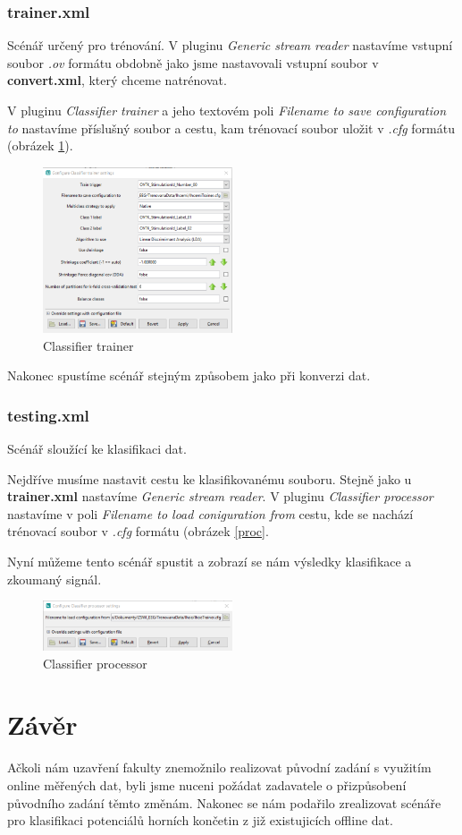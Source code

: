 \documentclass{report}
\begin{document}
\subsection{trainer.xml}
Scénář určený pro trénování. V pluginu \textit{Generic stream reader} nastavíme vstupní soubor \textit{.ov} formátu obdobně jako jsme nastavovali vstupní soubor v \textbf{convert.xml}, který chceme natrénovat.

V pluginu \textit{Classifier trainer} a jeho textovém poli \textit{Filename to save configuration to} nastavíme příslušný soubor a cestu, kam trénovací soubor uložit v \textit{.cfg} formátu (obrázek \ref{fig:trainer}).

  \begin{figure}[!ht]
\centering
  \includegraphics[width=0.5\textwidth]{pictures/trainer.png}
  \caption{Classifier trainer}
  \label{fig:trainer}
 \end{figure}

Nakonec spustíme scénář stejným způsobem jako při konverzi dat.
\subsection{testing.xml}
Scénář sloužící ke klasifikaci dat.

Nejdříve musíme nastavit cestu ke klasifikovanému souboru. Stejně jako u \textbf{trainer.xml} nastavíme \textit{Generic stream reader}.
V pluginu \textit{Classifier processor} nastavíme v poli \textit{Filename to load coniguration from} cestu, kde se nachází trénovací soubor v \textit{.cfg} formátu (obrázek \ref{proc}.

Nyní můžeme tento scénář spustit a zobrazí se nám výsledky klasifikace a zkoumaný signál.

  \begin{figure}[!ht]
\centering
  \includegraphics[width=0.5\textwidth]{pictures/processorclass.png}
  \caption{Classifier processor}
  \label{fig:btns}
 \end{figure}


\chapter{Závěr}
Ačkoli nám uzavření fakulty znemožnilo realizovat původní zadání s využitím online měřených dat, byli jsme nuceni požádat zadavatele o přizpůsobení původního zadání těmto změnám. Nakonec se nám podařilo zrealizovat scénáře pro klasifikaci potenciálů horních končetin z již existujicích offline dat.
\end{document}
